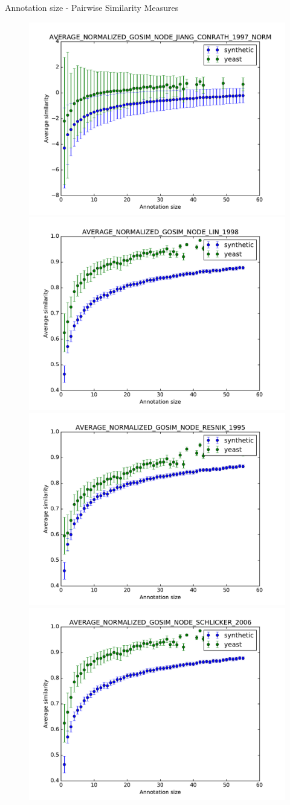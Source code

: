 \documentclass{beamer}
\begin{document}
\begin{frame}{Annotation size - Pairwise Similarity Measures}

\begin{figure}
\includegraphics[width=0.5\linewidth, height=0.4\textheight]{pairwise/SIM_GROUPWISE_AVERAGE_NORMALIZED_GOSIM_SIM_PAIRWISE_DAG_NODE_JIANG_CONRATH_1997_NORM_avg.pdf}
\includegraphics[width=0.5\linewidth, height=0.4\textheight]{pairwise/SIM_GROUPWISE_AVERAGE_NORMALIZED_GOSIM_SIM_PAIRWISE_DAG_NODE_LIN_1998_avg.pdf} \\
\includegraphics[width=0.5\linewidth, height=0.4\textheight]{pairwise/SIM_GROUPWISE_AVERAGE_NORMALIZED_GOSIM_SIM_PAIRWISE_DAG_NODE_RESNIK_1995_avg.pdf}
\includegraphics[width=0.5\linewidth, height=0.4\textheight]{pairwise/SIM_GROUPWISE_AVERAGE_NORMALIZED_GOSIM_SIM_PAIRWISE_DAG_NODE_SCHLICKER_2006_avg.pdf}
\end{figure}

\end{frame}
\end{document}
